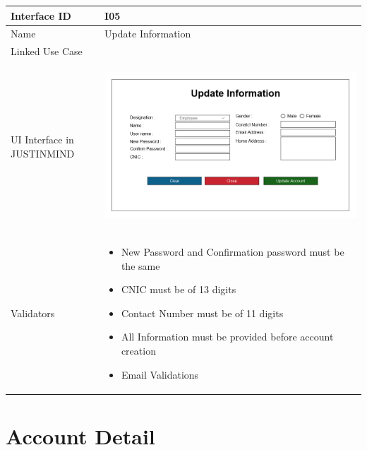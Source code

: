 \documentclass[12pt,a4paper]{report}
\begin{document}
\begin{tabular}{ | m{3cm} | m{12cm}| } \hline

Interface ID &  I05 \\\hline

Name  	      &  Update Information \\ \hline

Linked Use Case &  \\ \hline

UI Interface in JUSTINMIND & \begin{center} \includegraphics[scale=0.3]{./UIs for Latex Reports/UI-005 Update Account@1x.png}\end{center}  \\ \hline

Validators & 
\begin{itemize}
\item   New Password and Confirmation password must be the same
\item CNIC must be of 13 digits
\item Contact Number must be of 11 digits
\item All Information must be provided before account creation
\item Email Validations


\end{itemize}
\\ \hline

\end{tabular} 
\section{Account Detail }
\end{document}
